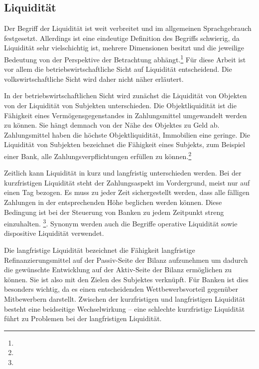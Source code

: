 \begin{onehalfspacing}
\section{Liquidität} 
Der Begriff der Liquidität ist weit verbreitet und im allgemeinen Sprachgebrauch festgesetzt. Allerdings ist eine eindeutige Definition des Begriffs schwierig, da Liquidität sehr vielschichtig ist, mehrere Dimensionen besitzt und die jeweilige Bedeutung von der Perspektive der Betrachtung abhängt.\footnote{ } Für diese Arbeit ist vor allem die betriebswirtschaftliche Sicht auf Liquidität entscheidend. Die volkswirtschaftliche Sicht wird daher nicht näher erläutert.

In der betriebswirtschaftlichen Sicht wird zunächst die Liquidität von Objekten von der Liquidität von Subjekten unterschieden. Die Objektliquidität ist die Fähigkeit eines Vermögensgegenstandes in Zahlungsmittel umgewandelt werden zu können. Sie hängt demnach von der Nähe des Objektes zu Geld ab. Zahlungsmittel haben die höchste Objektliquidität, Immobilien eine geringe. Die Liquidität von Subjekten bezeichnet die Fähigkeit eines Subjekts, zum Beispiel einer Bank, alle Zahlungsverpflichtungen erfüllen zu können.\footnote{ }

Zeitlich kann Liquidität in kurz und langfristig unterschieden werden. Bei der kurzfristigen Liquidität steht der Zahlungsaspekt im Vordergrund, meist nur auf einen Tag bezogen. Es muss zu jeder Zeit sichergestellt werden, dass alle fälligen Zahlungen in der entsprechenden Höhe beglichen werden können. Diese Bedingung ist bei der Steuerung von Banken zu jedem Zeitpunkt streng einzuhalten. \footnote{ }. Synonym werden auch die Begriffe operative Liquidität sowie dispositive Liquidität verwendet.

Die langfristige Liquidität bezeichnet die Fähigkeit langfristige Refinanzierungsmittel auf der Passiv-Seite der Bilanz aufzunehmen um dadurch die gewünschte Entwicklung auf der Aktiv-Seite der Bilanz ermöglichen zu können. Sie ist also mit den Zielen des Subjektes verknüpft. Für Banken ist dies besonders wichtig, da es einen entscheidenden Wettbewerbsvorteil gegenüber Mitbewerbern darstellt. Zwischen der kurzfristigen und langfristigen Liquidität besteht eine beidseitige Wechselwirkung -- eine schlechte kurzfristige Liquidität führt zu Problemen bei der langfristigen Liquidität.


\end{onehalfspacing}
